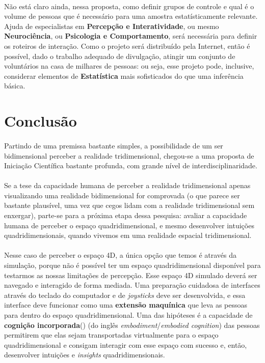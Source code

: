 \documentclass{article}
\begin{document}
	\paragraph{}
	Não está claro ainda, nessa proposta, como definir grupos de controle e qual é o volume de pessoas que é necessário para uma amostra estatísticamente relevante. Ajuda de especialistas em \textbf{Percepção e Interatividade}, ou mesmo \textbf{Neurociência}, ou \textbf{Psicologia e Comportamento}, será necessária para definir os roteiros de interação. Como o projeto será distribuído pela Internet, então é possível, dado o trabalho adequado de divulgação, atingir um conjunto de voluntários na casa de milhares de pessoas: ou seja, esse projeto pode, inclusive, considerar elementos de \textbf{Estatística} mais sofisticados do que uma inferência básica.

	\section{Conclusão} \label{c}
	
	\paragraph{}
	Partindo de uma premissa bastante simples, a possibilidade de um ser bidimensional perceber a realidade tridimensional, chegou-se a uma proposta de Iniciação Científica bastante profunda, com grande nível de interdisciplinaridade.
	
	\paragraph{}
	Se a tese da capacidade humana de perceber a realidade tridimensional apenas visualizando uma realidade bidimensional for comprovada (o que parece ser bastante plausível, uma vez que cegos lidam com a realidade tridimensional sem enxergar), parte-se para a próxima etapa dessa pesquisa: avaliar a capacidade humana de perceber o espaço quadridimensional, e mesmo desenvolver intuições quadridimensionais, quando vivemos em uma realidade espacial tridimensional.
	
	\paragraph{}
	Nesse caso de perceber o espaço 4D, a única opção que temos é através da simulação, porque não é possível ter um espaço quadridimensional disponível para testarmos as nossas limitações de percepção. Esse espaço 4D simulado deverá ser navegado e interagido de forma mediada. Uma preparação cuidadosa de interfaces através do teclado do computador e de \textit{joysticks} deve ser desenvolvida, e essa interface deve funcionar como uma \textbf{extensão maquínica} que leva as pessoas para dentro do espaço quadridimensional. Uma das hipóteses é a capacidade de \textbf{cognição incorporada}(\cite{2021Shapiro}) (do inglês \textit{embodiment}/\textit{embodied cognition}) das pessoas permitirem que elas sejam transportadas virtualmente para o espaço quadridimensional e consigam interagir com esse espaço com sucesso e, então, desenvolver intuições e \textit{insights} quadridimensionais.
	
\end{document}
